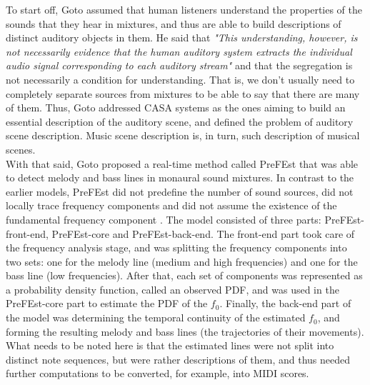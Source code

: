 To start off, Goto assumed that human listeners understand the properties of the sounds that they hear in mixtures, and thus are able to build descriptions of distinct auditory objects in them. He said that \textit{"This understanding, however, is not necessarily evidence that the human auditory system extracts the individual audio signal corresponding to each auditory stream"} \cite{Goto2004} and that the segregation is not necessarily a condition for understanding. That is, we don't usually need to completely separate sources from mixtures to be able to say that there are many of them. Thus, Goto addressed CASA systems as the ones aiming to build an essential description of the auditory scene, and defined the problem of auditory scene description. Music scene description is, in turn, such description of musical scenes.\\

With that said, Goto proposed a real-time method called PreFEst that was able to detect melody and bass lines in monaural sound mixtures. In contrast to the earlier models, PreFEst did not predefine the number of sound sources, did not locally trace frequency components and did not assume the existence of the fundamental frequency component \cite{Wang2006}. The model consisted of three parts: PreFEst-front-end, PreFEst-core and PreFEst-back-end. The front-end part took care of the frequency analysis stage, and was splitting the frequency components into two sets: one for the melody line (medium and high frequencies) and one for the bass line (low frequencies). After that, each set of components was represented as a probability density function, called an observed PDF, and was used in the PreFEst-core part to estimate the PDF of the $f_0$. Finally, the back-end part of the model was determining the temporal continuity of the estimated $f_0$, and forming the resulting melody and bass lines (the trajectories of their movements). What needs to be noted here is that the estimated lines were not split into distinct note sequences, but were rather descriptions of them, and thus needed further computations to be converted, for example, into MIDI scores.\\

